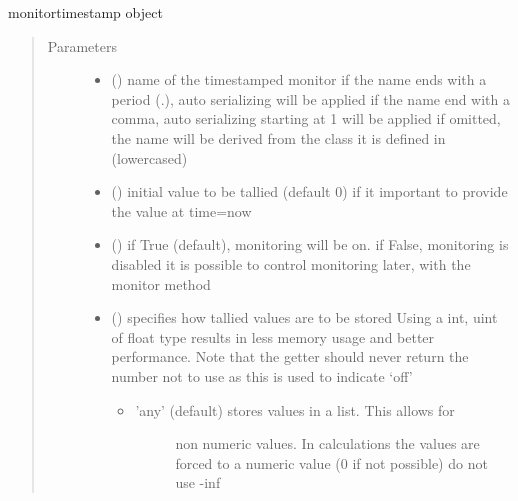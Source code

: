 \documentclass[letterpaper,10pt,english]{sphinxmanual}
\begin{document}
\begin{fulllineitems}
\label{\detokenize{Reference:salabim.MonitorTimestamp}}
monitortimestamp object
\begin{quote}\begin{description}
\item[{Parameters}] \leavevmode\begin{itemize}
\item {} 
 () \textendash{} name of the timestamped monitor
if the name ends with a period (.),
auto serializing will be applied 
if the name end with a comma,
auto serializing starting at 1 will be applied 
if omitted, the name will be derived from the class
it is defined in (lowercased)

\item {} 
 (\sphinxstyleliteralemphasis{, }) \textendash{} initial value to be tallied (default 0) 
if it important to provide the value at time=now

\item {} 
 () \textendash{} if True (default), monitoring will be on. 
if False, monitoring is disabled 
it is possible to control monitoring later,
with the monitor method

\item {} 
 () \textendash{} 
specifies how tallied values are to be stored
Using a int, uint of float type results in less memory usage and better
performance. Note that the getter should never return the number not to use
as this is used to indicate ‘off’
\begin{itemize}
\item {} \begin{description}
\item[{’any’ (default) stores values in a list. This allows for}] \leavevmode
non numeric values. In calculations the values are
forced to a numeric value (0 if not possible) do not use -inf

\end{description}


\end{itemize}
\end{itemize}
\end{description}
\end{quote}
\end{fulllineitems}
\end{document}
